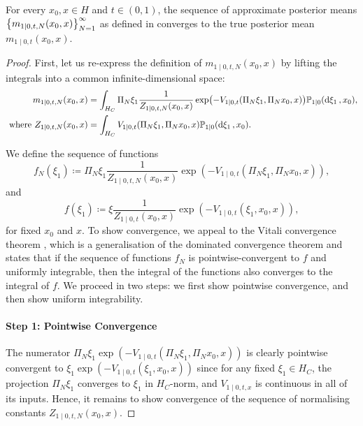 \begin{lemma}\label{lem:posteriormeanconvergence}
  For every \(x_{0}, x \in H\) and \(t \in (0, 1)\), the sequence of approximate posterior means \(\qty{m_{1 \mid 0, t, N}(x_{0}, x)}_{N=1}^{\infty}\)   as defined in  converges to the true posterior mean \(m_{1 \mid 0, t}(x_{0}, x)\).

  \begin{proof}
    First, let us re-express the definition of \(m_{1 \mid 0, t, N}(x_{0}, x)\) by lifting the integrals into a common infinite-dimensional space:
    \begin{align}
      m_{1 \mid 0, t, N}( x_{0}, x) &= \int_{H_{C}} \Pi_{N} \xi_{1} \frac{1}{Z_{1 \mid 0, t, N}(x_{0}, x)} \exp(-V_{1 \mid 0, t}(\Pi_{N} \xi_{1}, \Pi_{N} x_{0}, x)) \mathbb{P}_{1 \mid 0}(\dd{\xi_{1}}, x_{0}),  \label{eqn:lift}\\
      \text{ where } Z_{1 \mid 0, t, N}(x_{0}, x) &= \int_{H_{C}} V_{1 \mid 0, t}(\Pi_{N} \xi_{1}, \Pi_{N} x_{0}, x) \mathbb{P}_{1 \mid 0}(\dd{\xi_{1}}, x_{0}).\notag
    \end{align}

    We define the sequence of functions \[f_{N}(\xi_{1}) \coloneqq \Pi_{N} \xi_{1} \frac{1}{Z_{1 \mid 0, t, N}(x_{0}, x)}\exp(- V_{1 \mid 0, t}(\Pi_{N} \xi_{1}, \Pi_{N} x_{0}, x)),\] and \[f(\xi_{1}) \coloneqq \xi \frac{1}{Z_{1 \mid 0, t}(x_{0}, x)}\exp(-V_{1 \mid 0, t}(\xi_{1}, x_{0}, x)),\] for fixed \(x_{0}\) and  \(x\). To show convergence, we appeal to the Vitali convergence theorem \citep{walnut2011vitali}, which is a generalisation of the dominated convergence theorem and states that if the sequence of functions \(f_{N}\) is pointwise-convergent to \(f\) and uniformly integrable, then the integral of the functions also converges to the integral of \(f\). We proceed in two steps: we first show pointwise convergence, and then show uniform integrability.

    \paragraph{Step 1: Pointwise Convergence} The numerator \(\Pi_{N} \xi_{1} \exp(-V_{1 \mid 0, t}(\Pi_{N} \xi_{1}, \Pi_{N} x_{0}, x))\) is clearly pointwise convergent to \(\xi_{1} \exp(-V_{1 \mid 0, t}(\xi_{1}, x_{0}, x))\) since for any fixed \(\xi_{1} \in H_{C}\), the projection \(\Pi_{N} \xi_{1}\) converges to \(\xi_{1}\) in \(H_{C}\)-norm, and \(V_{1 \mid 0, t, x}\) is continuous in all of its inputs. Hence, it remains to show convergence of the sequence of normalising constants \(Z_{1 \mid 0, t, N}(x_{0}, x)\).


\end{proof}
\end{lemma}
